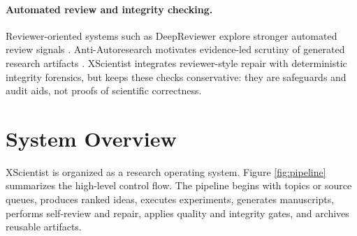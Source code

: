 \documentclass[11pt]{article}
\begin{document}
\paragraph{Automated review and integrity checking.}
Reviewer-oriented systems such as DeepReviewer explore stronger automated
review signals \cite{deepreviewer}. Anti-Autoresearch motivates evidence-led
scrutiny of generated research artifacts \cite{anti-autoresearch}. XScientist
integrates reviewer-style repair with deterministic integrity forensics, but
keeps these checks conservative: they are safeguards and audit aids, not
proofs of scientific correctness.

\section{System Overview}

XScientist is organized as a research operating system. Figure
\ref{fig:pipeline} summarizes the high-level control flow. The pipeline begins
with topics or source queues, produces ranked ideas, executes experiments,
generates manuscripts, performs self-review and repair, applies quality and
integrity gates, and archives reusable artifacts.
\end{document}
